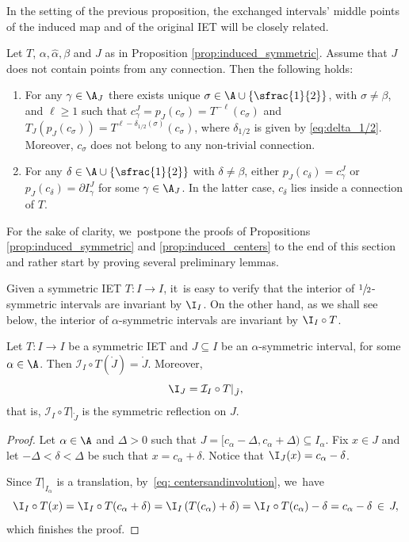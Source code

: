 In the setting of the previous proposition, the exchanged intervals' middle points of the induced map and of the original IET will be closely related.

\begin{proposition}
\label{prop:induced_centers}
Let $T$, $\alpha, \hat \alpha, \beta$ and $J$ as in Proposition \ref{prop:induced_symmetric}. Assume that $J$ does not contain points from any connection. Then the following holds:
\begin{enumerate}
\item For any $\gamma \in \A_J$ there exists unique $\sigma \in \A \cup \{\sfrac{1}{2}\}$, with $ \sigma \neq \beta$, and $\ell \geq 1$ such that $c_\gamma^J = p_J(c_\sigma) = T^{-\ell}(c_\sigma)$ and $T_J(p_J(c_\sigma)) = T^{\ell - \delta_{1/2}(\sigma)}(c_\sigma)$, where $\delta_{1/2}$ is given by \eqref{eq:delta_1/2}. Moreover, $c_\sigma$ does not belong to any non-trivial connection.
\item For any $\delta \in \A \cup \{\sfrac{1}{2}\}$ with $\delta \neq \beta$, either $p_J(c_\delta) = c_\gamma^J$ or $p_J(c_\delta) = \partial I_\gamma^J$ for some $\gamma \in \A_J$. In the latter case, $c_\delta$ lies inside a connection of $T$.
\end{enumerate}
\end{proposition}

For the sake of clarity, we~postpone the proofs of Propositions \ref{prop:induced_symmetric} and \ref{prop:induced_centers} to the end of this section and rather start by proving several preliminary lemmas.

Given a symmetric IET $T: I \to I$, it~is easy to verify that the interior of $\sfrac{1}{2}$\nobreak-sym\-metric intervals are invariant by $\I_I$. On the other hand, as we shall see below, the interior of $\alpha$-symmetric intervals are invariant by $\I_I \circ T$.

\begin{lemma}\label{lem: local_reflection}
Let $T : I \to I$ be a symmetric IET and $J \subseteq I$ be an $\alpha$-symmetric interval, for some $\alpha \in \A$. Then $\mathcal{I}_I\circ T(\mathring{J}) = \mathring{J}$. Moreover,
\[
\I_J = \mathcal{I}_I\circ T|_{\mathring{J}},
\]
that is, $\mathcal{I}_I\circ T|_{\mathring{J}}$ is the symmetric reflection on $J$.
\end{lemma}

\begin{proof}
Let $\alpha \in \A$ and $\Delta > 0$ such that $J = [c_\alpha - \Delta, c_\alpha + \Delta) \subseteq I_\alpha$. Fix $x\in J$ and let $-\Delta < \delta < \Delta$ be such that $x = c_{\alpha}+\delta$. Notice that $\I_J(x) = c_\alpha - \delta$.

Since $T|_{I_{\alpha}}$ is a translation, by~\eqref{eq: centersandinvolution}, we~have
\[
\I_I\circ T(x)=\I_I\circ T(c_{\alpha}+\delta)=\I_I\left(T(c_{\alpha}) +\delta\right)=
\I_I\circ T(c_{\alpha})-\delta=c_{\alpha}-\delta\,\in\, J,
\]
which finishes the proof.
\end{proof}


